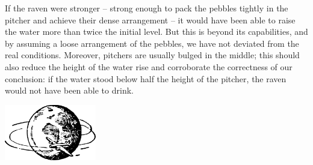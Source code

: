 If the raven were stronger -- strong enough to pack the pebbles tightly in the pitcher and achieve their dense arrangement -- it would have been able to raise the water more than twice the initial level. But this is beyond its capabilities, and by assuming a loose arrangement of the pebbles, we have not deviated from the real conditions. Moreover, pitchers are usually bulged in the middle; this should also reduce the height of the water rise and corroborate the correctness of our conclusion: if the water stood below half the height of the pitcher, the raven would not have been able to drink.

\begin{center}
\includegraphics[width=0.3\textwidth]{figures/ch-09/fig-ch-09-tail.pdf}
\end{center}


















